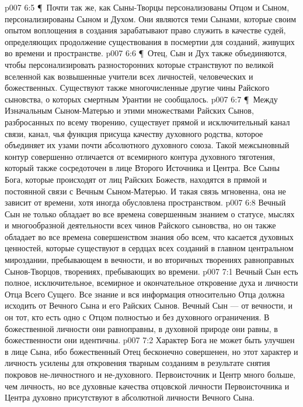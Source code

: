 \vs p007 6:5 \P\ Почти так же, как Сыны\hyp{}Творцы персонализованы Отцом и Сыном,  персонализированы Сыном и Духом. Они являются теми Сынами, которые своим опытом воплощения в создания зарабатывают право служить в качестве судей, определяющих продолжение существования в посмертии для созданий, живущих во времени и пространстве.
\vs p007 6:6 \P\ Отец, Сын и Дух также объединяются, чтобы персонализировать разносторонних  которые странствуют по великой вселенной как возвышенные учители всех личностей, человеческих и божественных. Существуют также многочисленные другие чины Райского сыновства, о которых смертным Урантии не сообщалось.
\vs p007 6:7 \P\ Между Изначальным Сыном\hyp{}Матерью и этими множествами Райских Сынов, разбросанных по всему творению, существует прямой и исключительный канал связи, канал, чья функция присуща качеству духовного родства, которое объединяет их узами почти абсолютного духовного союза. Такой межсыновный контур совершенно отличается от всемирного контура духовного тяготения, который также сосредоточен в лице Второго Источника и Центра. Все Сыны Бога, которые происходят от лиц Райских Божеств, находятся в прямой и постоянной связи с Вечным Сыном\hyp{}Матерью. И такая связь мгновенна, она не зависит от времени, хотя иногда обусловлена пространством.
\vs p007 6:8 Вечный Сын не только обладает во все времена совершенным знанием о статусе, мыслях и многообразной деятельности всех чинов Райского сыновства, но он также обладает во все времена совершенством знания обо всем, что касается духовных ценностей, которые существуют в сердцах всех созданий в главном центральном мироздании, пребывающем в вечности, и во вторичных творениях равноправных Сынов\hyp{}Творцов, творениях, пребывающих во времени.
\vs p007 7:1 Вечный Сын есть полное, исключительное, всемирное и окончательное откровение духа и личности Отца Всего Сущего. Все знание и вся информация относительно Отца должна исходить от Вечного Сына и его Райских Сынов. Вечный Сын --- от вечности, и он тот, кто есть одно с Отцом полностью и без духовного ограничения. В божественной личности они равноправны, в духовной природе они равны, в божественности они идентичны.
\vs p007 7:2 Характер Бога не может быть улучшен в лице Сына, ибо божественный Отец бесконечно совершенен, но этот характер и личность усилены для откровения тварным созданиям в результате снятия покровов не\hyp{}личностного и не\hyp{}духовного. Первоисточник и Центр много больше, чем личность, но все духовные качества отцовской личности Первоисточника и Центра духовно присутствуют в абсолютной личности Вечного Сына.
